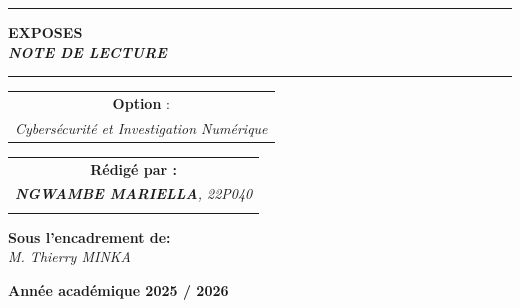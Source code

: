 \documentclass[memoire, 12pt]{report}
\begin{document}
\begin{titlepage}
\begin{center}
		\vspace{0.5cm}
		\begin{tabular}{l*{40}{@{\hskip 3.5cm}c@{\hskip5cm}} p{3.5cm} r}
		\end{tabular}
		
		\noindent\rule{\textwidth}{0.7mm}
		\Large{{\textbf{EXPOSES}}}\\
		\Large{{\textbf{\textit{NOTE DE LECTURE}}}}
		\noindent\rule{\textwidth}{0.7mm}
	\end{center}
		
	\begin{center}
	\begin{tabular}{c}
		
		\vspace{0.1cm}
		\normalsize
	
	
		\vspace{0.1cm}
		\normalsize\textbf{Option }:\\			
		\textsl{Cybersécurité et Investigation Numérique}
		
	\end{tabular}
	\end{center}
		
	\begin{center}
		\normalsize %
		\begin{tabular}{c}
			\vspace{0.07cm}
			\hspace{0.02cm} \textbf{\textbf{Rédigé par :}}\\
			\hspace{0.02cm} \textsl{\textbf{NGWAMBE  MARIELLA}, 22P040}\\\\
			
		\end{tabular}
	\end{center}
	
	\begin{center}
	\hspace{0.02cm} \textbf{Sous l'encadrement de:}\\
	\hspace{0.02cm} \textsl{M. Thierry MINKA}
	\end{center}
	
    
	\vspace{2cm}
	\begin{center}
		\textbf{Année académique 2025 / 2026}
	\end{center}
		
	\vspace{-1.4cm}
	
		
	\vfill%
	
\end{titlepage}
\end{document}
